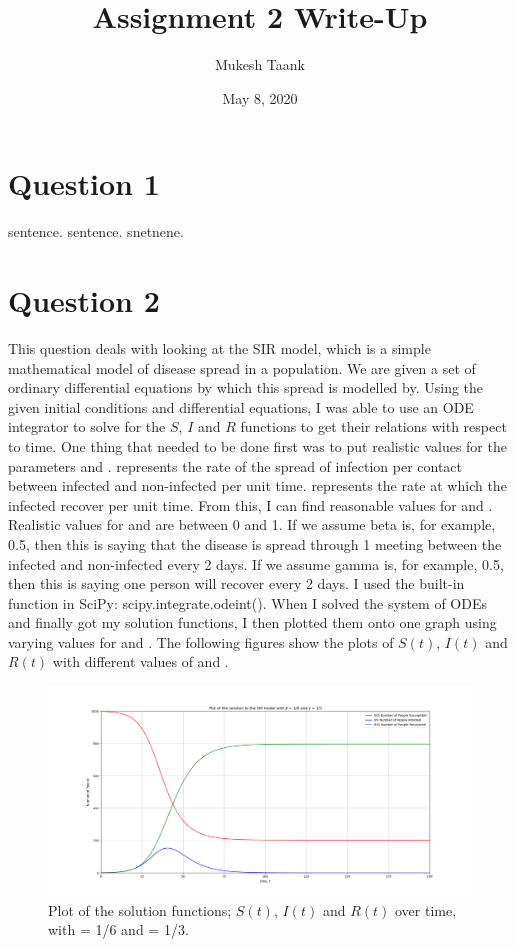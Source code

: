 \normalsize

\title{Assignment 2 Write-Up}
\author{Mukesh Taank}
\date{May 8, 2020}



\maketitle

\section*{Question 1}
sentence.
sentence.
snetnene.

\section*{Question 2}

This question deals with looking at the SIR model, which is a simple mathematical model of disease spread in a population. 
We are given a set of ordinary differential equations by which this spread is modelled by. 
Using the given initial conditions and differential equations, I was able to use an ODE integrator to solve for the $S$, $I$ and $R$ functions to get their relations with respect to time.
One thing that needed to be done first was to put realistic values for the parameters \beta and \gamma. 
\beta represents the rate of the spread of infection per contact between infected and non-infected per unit time.
\gamma represents the rate at which the infected recover per unit time.
From this, I can find reasonable values for \beta and \gamma. 
Realistic values for \beta and \gamma are between 0 and 1. 
If we assume beta is, for example, 0.5, then this is saying that the disease is spread through 1 meeting between the infected and non-infected every 2 days. 
If we assume gamma is, for example, 0.5, then this is saying one person will recover every 2 days. 
I used the built-in function in SciPy: scipy.integrate.odeint().
When I solved the system of ODEs and finally got my solution functions, I then plotted them onto one graph using varying values for \gamma and \beta.
The following figures show the plots of $S(t)$, $I(t)$ and $R(t)$ with different values of \beta and \gamma.

\begin{figure}
\includegraphics {Q2_plot1.png}
\caption{Plot of the solution functions; $S(t)$, $I(t)$ and $R(t)$ over time, with \beta = 1/6 and \gamma = 1/3.}
\label{fig:figureOfSIRPlot}
\end{figure}

